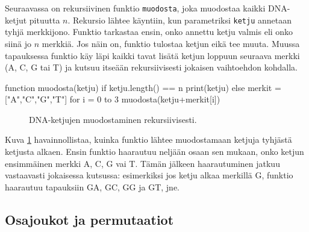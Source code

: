 Seuraavassa on rekursiivinen funktio \texttt{muodosta},
joka muodostaa kaikki DNA-ketjut pituutta $n$.
Rekursio lähtee käyntiin, kun parametriksi \texttt{ketju}
annetaan tyhjä merkkijono.
Funktio tarkastaa ensin, onko annettu ketju valmis
eli onko siinä jo $n$ merkkiä.
Jos näin on, funktio tulostaa ketjun eikä tee muuta.
Muussa tapauksessa funktio käy läpi kaikki tavat
lisätä ketjun loppuun seuraava merkki (A, C, G tai T)
ja kutsuu itseään rekursiivisesti jokaisen vaihtoehdon kohdalla.

\begin{code}
function muodosta(ketju)
    if ketju.length() == n
        print(ketju)
    else
        merkit = ["A","C","G","T"]
        for i = 0 to 3
            muodosta(ketju+merkit[i])
\end{code}

\begin{figure}
\center
{}
\caption{DNA-ketjujen muodostaminen rekursiivisesti.}
\label{fig:ketjut}
\end{figure}

Kuva \ref{fig:ketjut} havainnollistaa,
kuinka funktio lähtee muodostamaan ketjuja tyhjästä ketjusta alkaen.
Ensin funktio haarautuu neljään osaan sen mukaan,
onko ketjun ensimmäinen merkki A, C, G vai T.
Tämän jälkeen haarautuminen jatkuu vastaavasti
jokaisessa kutsussa:
esimerkiksi jos ketju alkaa merkillä G,
funktio haarautuu tapauksiin GA, GC, GG ja GT, jne.

\subsection{Osajoukot ja permutaatiot}

